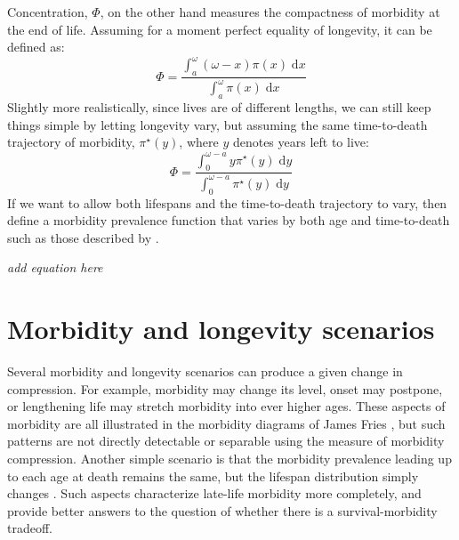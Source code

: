 \documentclass{article}
\newcommand{\dd}{\; \mathrm{d}}
\begin{document}
Concentration, $\Phi$, on the other hand measures the compactness of morbidity
at the end of life. Assuming for a moment perfect equality of longevity, it
can be defined as:
\begin{equation}
\Phi = \frac{\int_a^\omega (\omega - x)\pi(x) \dd x}{\int_a^\omega \pi(x) \dd
x}
\end{equation}
Slightly more realistically, since lives are of different lengths, we can
still keep things simple by letting longevity vary, but assuming the same
time-to-death trajectory of morbidity, $\pi^\star(y)$, where $y$ denotes years
left to live:
\begin{equation}
\Phi = \frac{\int_0^{\omega-a} y \pi^\star(y) \dd
y}{\int_0^{\omega-a}\pi^\star(y)\dd y}
\end{equation}
If we want to allow both lifespans and the time-to-death trajectory to vary,
then define a morbidity prevalence function that varies by both age and
time-to-death such as those described by \citet{riffe2015ttd}.

\textit{add equation here}
%

\section*{Morbidity and longevity scenarios}
Several morbidity and longevity scenarios can produce a given change in 
compression. For example, morbidity may change its level, onset may
postpone, or lengthening life may stretch morbidity into ever
higher ages. These aspects of morbidity are all illustrated in the morbidity
diagrams of James Fries \citep[e.g.,][]{fries2003measuring}, but such
patterns are not directly detectable or separable using the measure of morbidity
compression. Another simple scenario is that the morbidity prevalence leading up to each age at death remains the
same, but the lifespan distribution simply changes \citep{vanRaalte2015HLE}.
Such aspects characterize late-life morbidity more completely, and provide
better answers to the question of whether there is a survival-morbidity tradeoff.
\end{document}
